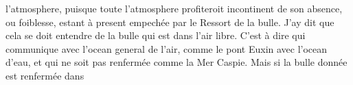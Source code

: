 l'atmosphere\protect{}, puisque toute l'atmosphere\protect{} profiteroit incontinent de son absence, ou foiblesse, estant \`{a} present empech\'{e}e par le Ressort de la bulle. J'ay dit que cela se doit entendre de la bulle qui est dans l'air libre. C'est \`{a} dire qui communique avec l'ocean general de l'air, comme le pont Euxin\protect{} avec l'ocean d'eau,  et qui ne soit pas renferm\'{e}e comme la Mer Caspie\protect{}.  Mais si la bulle donn\'{e}e  est renferm\'{e}e dans